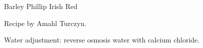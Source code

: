 \stylesection{\styleirishredale}

\begin{recipe}{Barley Phillip Irish Red} %

\begin{aboutblock}
Recipe by Amahl Turczyn. 
\end{aboutblock}


\begin{methodandtiming}
 
\begin{mashsteps}
\end{mashsteps}

\begin{fermentationsteps}
\end{fermentationsteps}

\begin{directions}
Water adjustment: reverse osmosis water with  calcium chloride.
\end{directions}

\end{methodandtiming}

\recipebreak

\begin{ingredientsblock}

\begin{malts}
\end{malts}

\begin{hops}
\end{hops}


\end{ingredientsblock}

\end{recipe}

